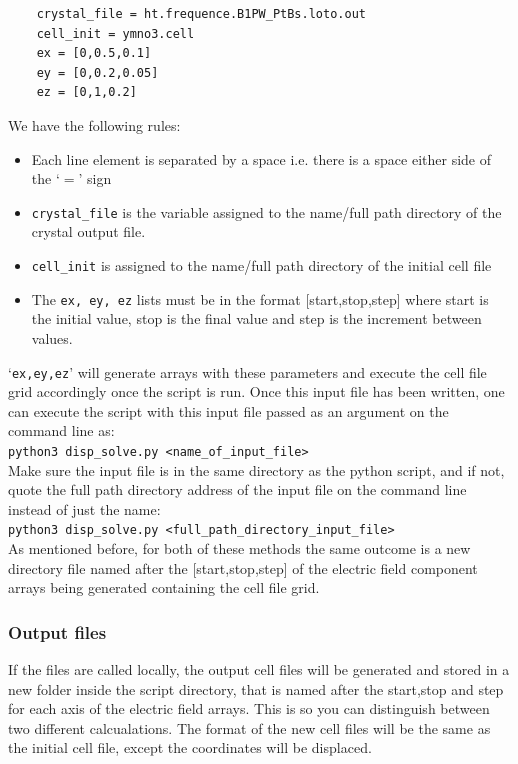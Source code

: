 \documentclass[10pt]{article}
\begin{document}
\begin{lstlisting}
	crystal_file = ht.frequence.B1PW_PtBs.loto.out
	cell_init = ymno3.cell
	ex = [0,0.5,0.1]
	ey = [0,0.2,0.05]
	ez = [0,1,0.2]
\end{lstlisting}

We have the following rules:

\begin{itemize}
	\item Each line element is separated by a space i.e. there is a space either side of the `$=$' sign
	\item \texttt{crystal\_file} is the variable assigned to the name/full path directory of the crystal output file.
	\item \texttt{cell\_init} is assigned to the name/full path directory of the initial cell file
	\item The \texttt{ex, ey, ez} lists must be in the format [start,stop,step] where start is the initial value, stop is the final value and step is the increment between values.
\end{itemize}

 `\texttt{ex,ey,ez}' will generate arrays with these parameters and execute the cell file grid accordingly once the script is run. Once this input file has been written, one can execute the script with this input file passed as an argument on the command line as:
\\
\texttt{python3 disp\_solve.py <name\_of\_input\_file>}
\\
Make sure the input file is in the same directory as the python script, and if not, quote the full path directory address of the input file on the command line instead of just the name:
\\
\texttt{python3 disp\_solve.py <full\_path\_directory\_input\_file>}
\\
As mentioned before, for both of these methods the same outcome is a new directory file named after the [start,stop,step] of the electric field component arrays being generated containing the cell file grid.

\subsubsection{Output files}

If the files are called locally, the output cell files will be generated and stored in a new folder inside the script directory, that is named after the start,stop and step for each axis of the electric field arrays. This is so you can distinguish between two different calcualations. The format of the new cell files will be the same as the initial cell file, except the coordinates will be displaced.
\end{document}
